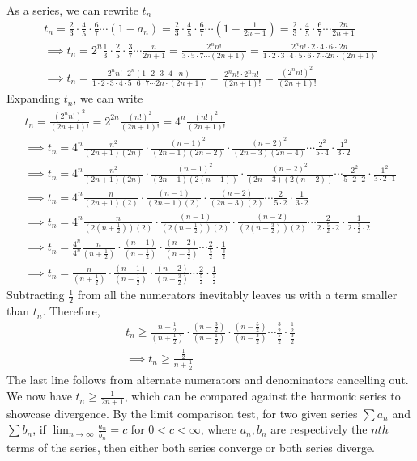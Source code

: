 As a series, we can rewrite $t_n$
\begin{gather*}
t_n = \frac{2}{3}\cdot\frac{4}{5}\cdot\frac{6}{7}\cdots(1-a_n) = \frac{2}{3}\cdot\frac{4}{5}\cdot\frac{6}{7}\cdots(1-\frac{1}{2n+1}) = \frac{2}{3}\cdot\frac{4}{5}\cdot\frac{6}{7}\cdots\frac{2n}{2n+1}\\
\implies t_n =  2^n\frac{1}{3}\cdot\frac{2}{5}\cdot\frac{3}{7}\cdots\frac{n}{2n+1} = \frac{2^n n!}{3\cdot5\cdot7\cdots(2n+1)} =  \frac{2^n n!\cdot2\cdot4\cdot6\cdots2n}{1\cdot2\cdot3\cdot4\cdot5\cdot6\cdot7\cdots2n\cdot(2n+1)}\\
\implies t_n =  \frac{2^n n!\cdot2^n(1\cdot2\cdot3\cdot4\cdots n)}{1\cdot2\cdot3\cdot4\cdot5\cdot6\cdot7\cdots2n\cdot(2n+1)} = \frac{2^n n!\cdot 2^n n!}{(2n+1)!} = \frac{(2^n n!)^2}{(2n+1)!}
\end{gather*}
Expanding $t_n$, we can write
\begin{gather*}
t_n = \frac{(2^n n!)^2}{(2n+1)!} = 2^{2n}\frac{(n!)^2}{(2n+1)!} = 4^{n}\frac{(n!)^2}{(2n+1)!}\\
\implies t_n = 4^n \frac{n^2}{(2n+1)(2n)}\cdot\frac{(n-1)^2}{(2n-1)(2n-2)}\cdot\frac{(n-2)^2}{(2n-3)(2n-4)}\cdots\frac{2^2}{5\cdot4}\cdot\frac{1^2}{3\cdot2}\\
\implies t_n = 4^n \frac{n^2}{(2n+1)(2n)}\cdot\frac{(n-1)^2}{(2n-1)(2(n-1))}\cdot\frac{(n-2)^2}{(2n-3)(2(n-2))}\cdots\frac{2^2}{5\cdot2\cdot2}\cdot\frac{1^2}{3\cdot2\cdot1}\\
\implies t_n = 4^n \frac{n}{(2n+1)(2)}\cdot\frac{(n-1)}{(2n-1)(2)}\cdot\frac{(n-2)}{(2n-3)(2)}\cdots\frac{2}{5\cdot2}\cdot\frac{1}{3\cdot2}\\
\implies t_n = 4^n \frac{n}{(2(n+\frac{1}{2}))(2)}\cdot\frac{(n-1)}{(2(n-\frac{1}{2}))(2)}\cdot\frac{(n-2)}{(2(n-\frac{3}{2}))(2)}\cdots\frac{2}{2\cdot\frac{5}{2}\cdot2}\cdot\frac{1}{2\cdot\frac{3}{2}\cdot2}\\
\implies t_n = \frac{4^n}{4^n} \frac{n}{(n+\frac{1}{2})}\cdot\frac{(n-1)}{(n-\frac{1}{2})}\cdot\frac{(n-2)}{(n-\frac{3}{2})}\cdots\frac{2}{\frac{5}{2}}\cdot\frac{1}{\frac{3}{2}}\\
\implies t_n = \frac{n}{(n+\frac{1}{2})}\cdot\frac{(n-1)}{(n-\frac{1}{2})}\cdot\frac{(n-2)}{(n-\frac{3}{2})}\cdots\frac{2}{\frac{5}{2}}\cdot\frac{1}{\frac{3}{2}}
\end{gather*}
Subtracting $\frac{1}{2}$ from all the numerators inevitably leaves us with a term smaller than $t_n$. Therefore,
\begin{gather*}
t_n \ge\frac{n-\frac{1}{2}}{(n+\frac{1}{2})}\cdot\frac{(n-\frac{3}{2})}{(n-\frac{1}{2})}\cdot\frac{(n-\frac{5}{2})}{(n-\frac{3}{2})}\cdots\frac{\frac{3}{2}}{\frac{5}{2}}\cdot\frac{\frac{1}{2}}{\frac{3}{2}}\\
\implies t_n \ge \frac{\frac{1}{2}}{n+\frac{1}{2}}
\end{gather*}
The last line follows from alternate numerators and denominators cancelling out. We now have $t_n \ge \frac{1}{2n+1}$, which can be compared against the harmonic series to showcase divergence. By the limit comparison test, for two given series $\sum a_n$ and $\sum b_n$, if $\lim_{n\to\infty} \frac{a_n}{b_n} = c$ for $0<c<\infty$, where $a_n,b_n$ are respectively the $nth$ terms of the series, then either both series converge or both series diverge.

